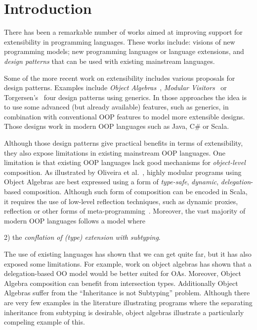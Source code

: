 \section{Introduction}


There has been a remarkable number of works aimed at improving support
for extensibility in programming languages. These works include:
visions of new programming models\cite{}; new programming languages or
language extensions\cite{}, and \emph{design patterns} that can be
used with existing mainstream languages.


Some of the more recent work on extensibility includes various
proposals for design patterns.  Examples include \emph{Object
  Algebras}~\cite{}, \emph{Modular Visitors}~\cite{} or
Torgersen's~\cite{} four design patterns using generics. In those
approaches the idea is to use some advanced (but already available)
features, such as generics, in combination with conventional OOP
features to model more extensible designs. Those designs work in
modern OOP languages such as Java, C\# or Scala. 

Although those design patterns give practical benefits in terms of
extensibility, they also expose limitations in existing mainstream OOP
languages. One limitation is that existing OOP languages lack
good mechanisms for \emph{object-level} composition.  As illustrated
by Oliveira et al.~\cite{}, highly modular programs using Object
Algebras are best expressed using a form of \emph{type-safe},
\emph{dynamic}, \emph{delegation}-based composition. Although such
form of composition can be encoded in Scala, it requires the use of
low-level reflection techniques, such as dynamic proxies, reflection
or other forms of meta-programming~\cite{}. Moreover, the vast 
majority of modern OOP languages follows a model where 

 2) the
\emph{conflation of (type) extension with subtyping}.

The use of existing languages has shown that we can get quite far, but 
it has also exposed some limitations. For example, work on object
algebras has shown that a delegation-based OO model would be better 
suited for OAs. Moreover, Object Algebra composition can benefit from 
intersection types. Additionally Object Algebras suffer from the
``Inheritance is not Subtyping'' problem. Although there are very few
examples in the literature illustrating programs where the separating 
inheritance from subtyping is desirable, object algebras illustrate a 
particularly compeling example of this. 

